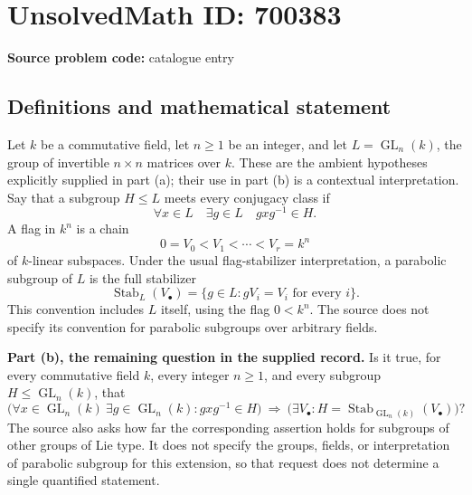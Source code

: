\documentclass[11pt]{article}
\begin{document}
\section*{UnsolvedMath ID: 700383}
\textbf{Source problem code:} catalogue entry
\subsection{Definitions and mathematical statement}
Let \(k\) be a commutative field, let \(n\geq 1\) be an integer, and let \(L=\operatorname{GL}_n(k)\), the group of invertible \(n\times n\) matrices over \(k\). These are the ambient hypotheses explicitly supplied in part (a); their use in part (b) is a contextual interpretation. Say that a subgroup \(H\leq L\) meets every conjugacy class if
\[
\forall x\in L\quad \exists g\in L\quad gxg^{-1}\in H.
\]
A flag in \(k^n\) is a chain
\[
0=V_0<V_1<\cdots<V_r=k^n
\]
of \(k\)-linear subspaces. Under the usual flag-stabilizer interpretation, a parabolic subgroup of \(L\) is the full stabilizer
\[
\operatorname{Stab}_L(V_\bullet)=\{g\in L:gV_i=V_i\text{ for every }i\}.
\]
This convention includes \(L\) itself, using the flag \(0<k^n\). The source does not specify its convention for parabolic subgroups over arbitrary fields.

\textbf{Part (b), the remaining question in the supplied record.} Is it true, for every commutative field \(k\), every integer \(n\geq1\), and every subgroup \(H\leq\operatorname{GL}_n(k)\), that
\[
\bigl(\forall x\in\operatorname{GL}_n(k)\ \exists g\in\operatorname{GL}_n(k):gxg^{-1}\in H\bigr)
\ \Longrightarrow\ 
\bigl(\exists V_\bullet:H=\operatorname{Stab}_{\operatorname{GL}_n(k)}(V_\bullet)\bigr)?
\]
The source also asks how far the corresponding assertion holds for subgroups of other groups of Lie type. It does not specify the groups, fields, or interpretation of parabolic subgroup for this extension, so that request does not determine a single quantified statement.
\end{document}
